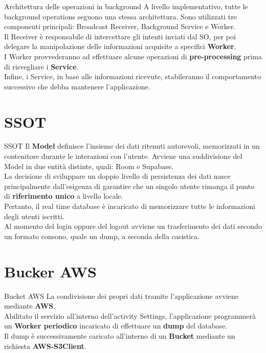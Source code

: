 \documentclass[10pt]{beamer}
\begin{document}
\begin{frame}{Architettura delle operazioni in background}
    \small A livello implementativo, tutte le background operations seguono una stessa architettura. Sono utilizzati tre componenti principali: Broadcast Receiver, Background Service e Worker. \vspace*{7pt}\\ Il Receiver è responsabile di intercettare gli intenti inviati dal SO, per poi delegare la manipolazione delle informazioni acquisite a specifici \textbf{Worker}. \vspace*{7pt}\\ I Worker provvederanno ad effettuare alcune operazioni di \textbf{pre-processing} prima di risvegliare i \textbf{Service}. \vspace*{7pt}\\ Infine, i Service, in base alle informazioni ricevute, stabileranno il comportamento successivo che debba mantenere l'applicazione.
\end{frame}

\section{SSOT}
\begin{frame}{SSOT}
    \small Il \textbf{Model} definisce l'insieme dei dati ritenuti autorevoli, memorizzati in un contenitore durante le interazioni con l'utente. Avviene una suddivisione del Model in due entità distinte, quali: Room e Supabase. \vspace*{7pt}\\ La decisione di sviluppare un doppio livello di persistenza dei dati nasce principalmente dall'esigenza di garantire che un singolo utente rimanga il punto di \textbf{riferimento unico} a livello locale. \vspace*{7pt}\\ Pertanto, il real time database è incaricato di memorizzare tutte le informazioni degli utenti iscritti. \vspace{7pt}\\ Al momento del login oppure del logout avviene un trasferimento dei dati secondo un formato consono, quale un dump, a seconda della casistica.
\end{frame}

\section{Bucker AWS}
\begin{frame}{Bucket AWS}
    \small La condivisione dei propri dati tramite l'applicazione avviene mediante \textbf{AWS}. \vspace*{7pt}\\ Abilitato il servizio all'interno dell'activity Settings, l'applicazione programmerà un \textbf{Worker periodico} incaricato di effettuare un \textbf{dump} del database. \vspace*{7pt}\\ Il dump è successivamente caricato all'interno di un \textbf{Bucket} mediante un richiesta \textbf{AWS-S3Client}.
\end{frame}
\end{document}
